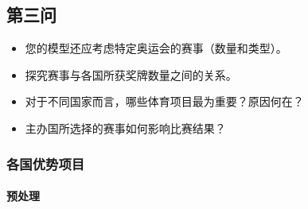 \documentclass[11pt]{article}
\providecommand{\tightlist}{%
      \setlength{\itemsep}{0pt}\setlength{\parskip}{0pt}}
\begin{document}
    \subsection{第三问}\label{ux7b2cux4e09ux95ee}

    \begin{itemize}
\tightlist
\item
  您的模型还应考虑特定奥运会的赛事（数量和类型）。
\item
  探究赛事与各国所获奖牌数量之间的关系。
\item
  对于不同国家而言，哪些体育项目最为重要？原因何在？
\item
  主办国所选择的赛事如何影响比赛结果？
\end{itemize}

    \subsubsection{各国优势项目}\label{ux5404ux56fdux4f18ux52bfux9879ux76ee}

    \paragraph{预处理}\label{ux9884ux5904ux7406}
\end{document}
